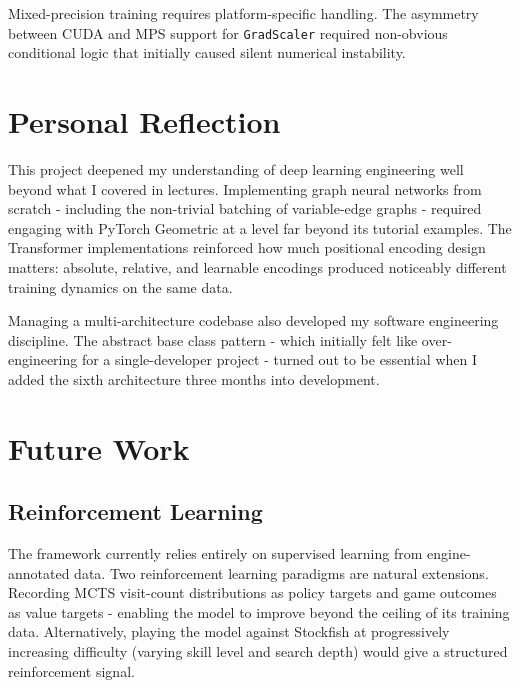 Mixed-precision training requires platform-specific handling. The asymmetry between CUDA and MPS support for \texttt{GradScaler} required non-obvious conditional logic that initially caused silent numerical instability.

\section{Personal Reflection}

This project deepened my understanding of deep learning engineering well beyond what I covered in lectures. Implementing graph neural networks from scratch - including the non-trivial batching of variable-edge graphs - required engaging with PyTorch Geometric at a level far beyond its tutorial examples. The Transformer implementations reinforced how much positional encoding design matters: absolute, relative, and learnable encodings produced noticeably different training dynamics on the same data.

Managing a multi-architecture codebase also developed my software engineering discipline. The abstract base class pattern - which initially felt like over-engineering for a single-developer project - turned out to be essential when I added the sixth architecture three months into development.


\section{Future Work}

\subsection{Reinforcement Learning}

The framework currently relies entirely on supervised learning from engine-annotated data. Two reinforcement learning paradigms are natural extensions. Recording MCTS visit-count distributions as policy targets and game outcomes as value targets - enabling the model to improve beyond the ceiling of its training data. Alternatively, playing the model against Stockfish at progressively increasing difficulty (varying skill level and search depth) would give a structured reinforcement signal.

